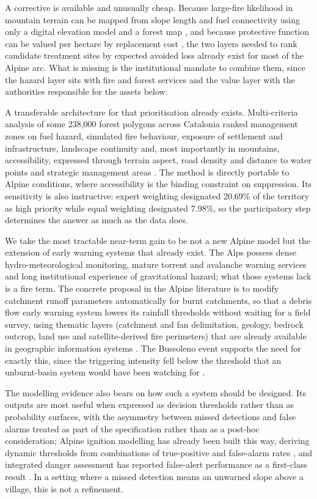 \documentclass[11pt,a4paper]{article}
\begin{document}
A corrective is available and unusually cheap. Because large-fire likelihood in mountain terrain can be mapped from slope length and fuel connectivity using only a digital elevation model and a forest map \citep{conedera_linking_2024}, and because protective function can be valued per hectare by replacement cost \citep{accastello_asforesee_2019}, the two layers needed to rank candidate treatment sites by expected avoided loss already exist for most of the Alpine arc. What is missing is the institutional mandate to combine them, since the hazard layer sits with fire and forest services and the value layer with the authorities responsible for the assets below.

A transferable architecture for that prioritisation already exists. Multi-criteria analysis of some 238{,}000 forest polygons across Catalonia ranked management zones on fuel hazard, simulated fire behaviour, exposure of settlement and infrastructure, landscape continuity and, most importantly in mountains, accessibility, expressed through terrain aspect, road density and distance to water points and strategic management areas \citep{krsnik_spatial_2024}. The method is directly portable to Alpine conditions, where accessibility is the binding constraint on suppression. Its sensitivity is also instructive: expert weighting designated 20.69\% of the territory as high priority while equal weighting designated 7.98\%, so the participatory step determines the answer as much as the data does.

We take the most tractable near-term gain to be not a new Alpine model but the extension of early warning systems that already exist. The Alps possess dense hydro-meteorological monitoring, mature torrent and avalanche warning services and long institutional experience of gravitational hazard; what those systems lack is a fire term. The concrete proposal in the Alpine literature is to modify catchment runoff parameters automatically for burnt catchments, so that a debris flow early warning system lowers its rainfall thresholds without waiting for a field survey, using thematic layers (catchment and fan delimitation, geology, bedrock outcrop, land use and satellite-derived fire perimeters) that are already available in geographic information systems \citep{tiranti_wildfires_2021}. The Bussoleno event supports the need for exactly this, since the triggering intensity fell below the threshold that an unburnt-basin system would have been watching for \citep{laporta_postwildfire_2025}.

The modelling evidence also bears on how such a system should be designed. Its outputs are most useful when expressed as decision thresholds rather than as probability surfaces, with the asymmetry between missed detections and false alarms treated as part of the specification rather than as a post-hoc consideration; Alpine ignition modelling has already been built this way, deriving dynamic thresholds from combinations of true-positive and false-alarm rates \citep{moreno_1_nodate}, and integrated danger assessment has reported false-alert performance as a first-class result \citep{muller_towards_2020}. In a setting where a missed detection means an unwarned slope above a village, this is not a refinement.
\end{document}
